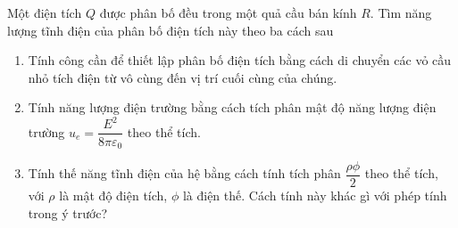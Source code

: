  \begin{vd}
    \label{c291}
    Một điện tích $Q$ được phân bố đều trong một quả cầu bán kính $R$. Tìm năng lượng tĩnh điện của phân bố điện tích này theo ba cách sau 
    \begin{enumerate}[1)]
    \setlength{\itemsep}{0pt}
        \item Tính công cần để thiết lập phân bố điện tích bằng cách di chuyển các vỏ cầu nhỏ tích điện từ vô cùng đến vị trí cuối cùng của chúng.
        \item Tính năng lượng điện trường bằng cách tích phân mật độ năng lượng điện trường $u_e=\dfrac{E^2}{8\pi \varepsilon_0}$ theo thể tích.
        \item Tính thế năng tĩnh điện của hệ bằng cách tính tích phân $\dfrac{\rho\phi}{2}$ theo thể tích, với $\rho$ là mật độ điện tích, $\phi$ là điện thế. Cách tính này khác gì với phép tính trong ý trước?
    \end{enumerate}
    \end{vd}
